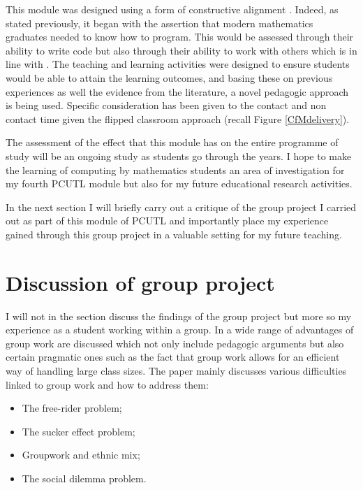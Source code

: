 \documentclass{article}
\begin{document}
This module was designed using a form of constructive alignment \cite{biggs_teaching_2011}. Indeed, as stated previously, it began with the assertion that modern mathematics graduates needed to know how to program. This would be assessed through their ability to write code but also through their ability to work with others which is in line with \cite{cardiff_university_way_2013}. The teaching and learning activities were designed to ensure students would be able to attain the learning outcomes, and basing these on previous experiences as well the evidence from the literature, a novel pedagogic approach is being used. Specific consideration has been given to the contact and non contact time given the flipped classroom approach (recall Figure \ref{CfMdelivery}).

The assessment of the effect that this module has on the entire programme of study will be an ongoing study as students go through the years. I hope to make the learning of computing by mathematics students an area of investigation for my fourth PCUTL module but also for my future educational research activities.

In the next section I will briefly carry out a critique of the group project I carried out as part of this module of PCUTL and importantly place my experience gained through this group project in a valuable setting for my future teaching.

\section{Discussion of group project}

I will not in the section discuss the findings of the group project but more so my experience as a student working within a group. In \cite{davies_groupwork_2009} a wide range of advantages of group work are discussed which not only include pedagogic arguments but also certain pragmatic ones such as the fact that group work allows for an efficient way of handling large class sizes. The paper mainly discusses various difficulties linked to group work and how to address them:

\begin{itemize}
    \item The free-rider problem;
    \item The sucker effect problem;
    \item Groupwork and ethnic mix;
    \item The social dilemma problem.
\end{itemize}
\end{document}
